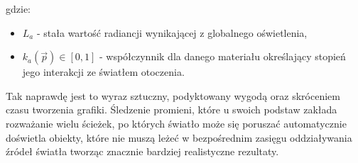 gdzie:
\begin{itemize}
\item[] $L_a$ - stała wartość radiancji wynikającej z globalnego oświetlenia,
\item[] $k_a(\vec{p}) \in [0, 1]$ - współczynnik dla danego materiału określający stopień jego interakcji ze światłem otoczenia.
\end{itemize}
Tak naprawdę jest to wyraz sztuczny, podyktowany wygodą oraz skróceniem czasu tworzenia grafiki. Śledzenie promieni, które u swoich podstaw zakłada rozważanie wielu ścieżek, po których światło może się poruszać automatycznie doświetla obiekty, które nie muszą leżeć w bezpośrednim zasięgu oddziaływania źródeł światła tworząc znacznie bardziej realistyczne rezultaty. 
